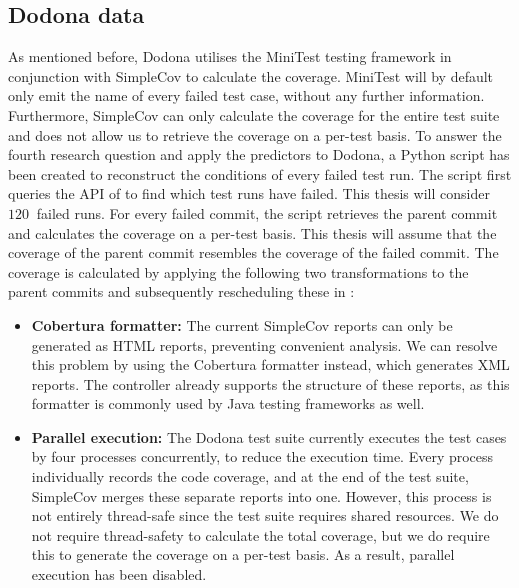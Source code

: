 
\subsection{Dodona data}
As mentioned before, Dodona utilises the MiniTest testing framework in conjunction with SimpleCov to calculate the coverage. MiniTest will by default only emit the name of every failed test case, without any further information. Furthermore, SimpleCov can only calculate the coverage for the entire test suite and does not allow us to retrieve the coverage on a per-test basis. To answer the fourth research question and apply the \velocity{} predictors to Dodona, a Python script has been created to reconstruct the conditions of every failed test run. The script first queries the API of \githubactions{} to find which test runs have failed. This thesis will consider $\SI{120}{}$ failed runs. For every failed commit, the script retrieves the parent commit and calculates the coverage on a per-test basis. This thesis will assume that the coverage of the parent commit resembles the coverage of the failed commit. The coverage is calculated by applying the following two transformations to the parent commits and subsequently rescheduling these in \githubactions{}:

\begin{itemize}
	\item \textbf{Cobertura formatter:} The current SimpleCov reports can only be generated as HTML reports, preventing convenient analysis. We can resolve this problem by using the Cobertura formatter instead, which generates XML reports. The controller already supports the structure of these reports, as this formatter is commonly used by Java testing frameworks as well.
	
	\item \textbf{Parallel execution:} The Dodona test suite currently executes the test cases by four processes concurrently, to reduce the execution time. Every process individually records the code coverage, and at the end of the test suite, SimpleCov merges these separate reports into one. However, this process is not entirely thread-safe since the test suite requires shared resources. We do not require thread-safety to calculate the total coverage, but we do require this to generate the coverage on a per-test basis. As a result, parallel execution has been disabled.
	
\end{itemize}